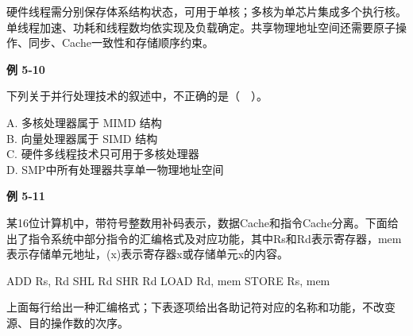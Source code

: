硬件线程需分别保存体系结构状态，可用于单核；多核为单芯片集成多个执行核。单线程加速、功耗和线程数均依实现及负载确定。共享物理地址空间还需要原子操作、同步、Cache一致性和存储顺序约束。

\par\medskip{}\noindent\hypertarget{CO05-E10}{}\label{CO05-E10}\textbf{例 5-10}\par\nobreak\smallskip

下列关于并行处理技术的叙述中，不正确的是（　）。

A. 多核处理器属于 MIMD 结构\\
B. 向量处理器属于 SIMD 结构\\
C. 硬件多线程技术只可用于多核处理器\\
D. SMP中所有处理器共享单一物理地址空间

\par\medskip{}\noindent\hypertarget{CO05-E11}{}\label{CO05-E11}\textbf{例 5-11}\par\nobreak\smallskip

某16位计算机中，带符号整数用补码表示，数据Cache和指令Cache分离。下面给出了指令系统中部分指令的汇编格式及对应功能，其中Rs和Rd表示寄存器，mem表示存储单元地址，(x)表示寄存器x或存储单元x的内容。

\par\smallskip\noindent\begin{minipage}{\linewidth}
\begin{codeblock}[language={}]
ADD   Rs, Rd
SHL   Rd
SHR   Rd
LOAD  Rd, mem
STORE Rs, mem
\end{codeblock}
\end{minipage}\par\smallskip

上面每行给出一种汇编格式；下表逐项给出各助记符对应的名称和功能，不改变源、目的操作数的次序。

